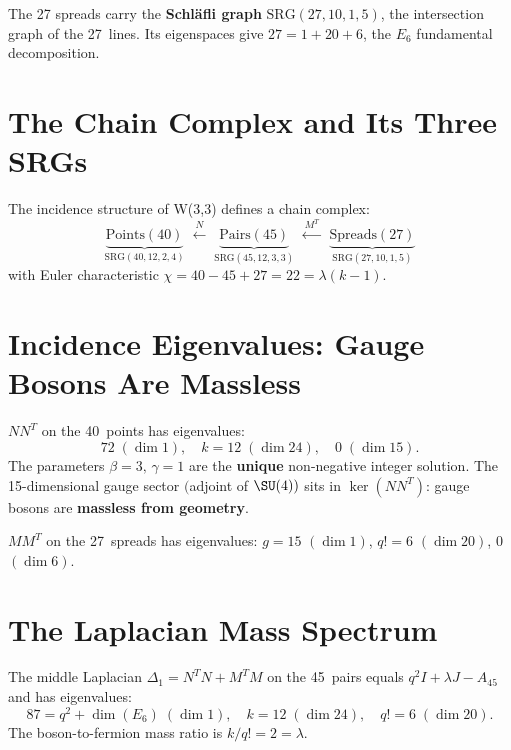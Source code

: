 The 27 spreads carry the \textbf{Schl\"afli graph} $\mathrm{SRG}(27,10,1,5)$,
the intersection graph of the 27~lines.
Its eigenspaces give $27 = 1 + 20 + 6$, the $E_6$ fundamental decomposition.


\section{The Chain Complex and Its Three SRGs}

The incidence structure of W(3,3) defines a chain complex:
\begin{equation}
\underbrace{\text{Points}(40)}_{\mathrm{SRG}(40,12,2,4)}
\;\xleftarrow{\;N\;}\;
\underbrace{\text{Pairs}(45)}_{\mathrm{SRG}(45,12,3,3)}
\;\xleftarrow{\;M^T\;}\;
\underbrace{\text{Spreads}(27)}_{\mathrm{SRG}(27,10,1,5)}
\end{equation}
with Euler characteristic
$\chi = 40 - 45 + 27 = 22 = \lambda(k{-}1)$.


\section{Incidence Eigenvalues: Gauge Bosons Are Massless}

\begin{theorem}
$NN^T$ on the 40~points has eigenvalues:
\begin{equation}
\boxed{72\;(\dim 1),\quad k = 12\;(\dim 24),\quad 0\;(\dim 15).}
\end{equation}
The parameters $\beta=3,\,\gamma=1$ are the \textbf{unique}
non-negative integer solution. The 15-dimensional gauge sector
$($adjoint of $\SU(4))$ sits in $\ker(NN^T)$:
gauge bosons are \textbf{massless from geometry}.
\end{theorem}

\begin{theorem}
$MM^T$ on the 27~spreads has eigenvalues:
$g=15$ $(\dim 1)$, $q!=6$ $(\dim 20)$, $0$ $(\dim 6)$.
\end{theorem}


\section{The Laplacian Mass Spectrum}

\begin{theorem}
The middle Laplacian $\Delta_1 = N^T N + M^T M$ on the 45~pairs equals
$q^2 I + \lambda J - A_{45}$ and has eigenvalues:
\begin{equation}
\boxed{87 = q^2 + \dim(E_6)\;(\dim 1),\quad k = 12\;(\dim 24),\quad q! = 6\;(\dim 20).}
\end{equation}
The boson-to-fermion mass ratio is $k/q! = 2 = \lambda$.
\end{theorem}


